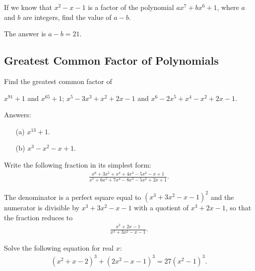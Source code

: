 \begin{question}[name={2017 Ecuador}]
    If we know that $x^2-x-1$ is a factor of the polynomial $ax^7+bx^6+1$, where $a$ and $b$ are integers, find the value of $a-b$.
\end{question}

\begin{solution}
    The answer is $a-b=21$.
\end{solution}

\subsection{Greatest Common Factor of Polynomials}


\begin{question}
Find the greatest common factor of
\begin{tasks}
    \task $x^{91}+1$ and $x^{65}+1$;
    \task $x^5-3x^3+x^2+2x-1$ and $x^6-2x^5+x^4-x^2+2x-1$.
\end{tasks}
\end{question}

\begin{solution}[name=Solution by Parviz Shahriari]
Answers:
\begin{itemize}
    \item[(a)] $x^{13}+1$. 
    \item[(b)] $x^3-x^2-x+1$. 
\end{itemize}
\end{solution}

\begin{question}
Write the following fraction in its simplest form:
\begin{align*}
    \frac{x^6+3x^5+x^4+4x^3-5x^2-x+1}{x^7+6x^5+7x^4-8x^3-5x^2+2x+1}.
\end{align*}
\end{question}

\begin{solution}[name=Solution by Parviz Shahriari]
The denominator is a perfect square equal to $(x^3+3x^2-x-1)^2$ and the numerator is divisible by $x^3+3x^2-x-1$ with a quotient of $x^3+2x-1$, so that the fraction reduces to
\begin{align*}
    \frac{x^3+2x-1}{x^3+3x^2-x-1}.
\end{align*}
\end{solution}


\begin{question}
Solve the following equation for real $x$:
\begin{align*}
    (x^2+x-2)^3 + (2x^2-x-1)^3 = 27(x^2-1)^3.
\end{align*}
\end{question}

